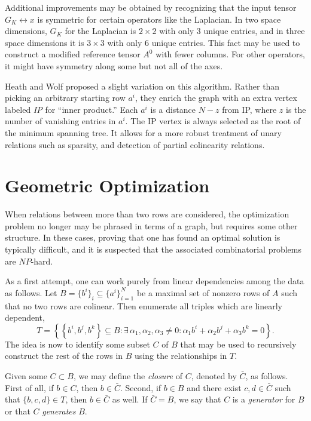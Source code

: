 Additional improvements may be obtained by recognizing that the input
tensor \( G_K \leftrightarrow x \) is symmetric for certain operators
like the Laplacian. In two space dimensions, \( G_K \) for the
Laplacian is \( 2 \times 2 \) with only 3 unique entries, and in three
space dimensions it is \( 3 \times 3 \) with only 6 unique entries.
This fact may be used to construct a modified reference tensor \(
A^0 \) with fewer columns.  For other operators, it might have
symmetry along some but not all of the axes.

Heath and Wolf proposed a slight variation on this algorithm.  Rather
than picking an arbitrary starting row \( a^i \), they enrich the
graph with an extra vertex labeled \textit{IP} for ``inner product.''
Each \( a^i \) is a distance \( N - z \) from IP, where \( z \) is the
number of vanishing entries in \( a^i \).  The IP vertex is always
selected as the root of the minimum spanning tree.  It allows for a
more robust treatment of unary relations such as sparsity, and
detection of partial colinearity relations.

\section{Geometric Optimization}
\label{sec:kirby4:geom}

When relations between more than two rows are considered, the
optimization problem no longer may be phrased in terms of a graph, but
requires some other structure.  In these cases, proving that one has
found an optimal solution is typically difficult, and it is suspected
that the associated combinatorial problems are \( NP \)-hard.

As a first attempt, one can work purely from linear dependencies among
the data as follows.  Let \( B=\{ b^i \}_i \subseteq \{ a^i \}_{i=1}^N
\) be a maximal set of nonzero rows of \( A \) such that no two rows
are colinear. Then enumerate all triples which are linearly dependent,
\begin{displaymath}
  T = \left\{ \left\{ b^i , b^j , b^k \right\} \subseteq B:
  \exists \, \alpha_1, \alpha_2, \alpha_3 \neq 0:
  \alpha_1 b^i + \alpha_2 b^j + \alpha_3 b^k = 0 \right\}.
\end{displaymath}
The idea is now to identify some subset $C$ of \( B \) that may be
used to recursively construct the rest of the rows in \( B \) using
the relationships in \( T \).

Given some \( C \subset B \), we may define the \emph{closure} of \(
C \), denoted by \( \bar{C} \), as follows.  First of all, if \( b
\in C \), then \( b \in \bar{C} \).  Second, if \( b \in B \) and
there exist \( c,d \in \bar{C} \) such that \( \{b,c,d\} \in T \),
then \( b \in \bar{C} \) as well.  If \( \bar{C} = B\), we say
that \( C \) is a \emph{generator} for \( B \) or that \( C \)
\emph{generates} \( B \).

